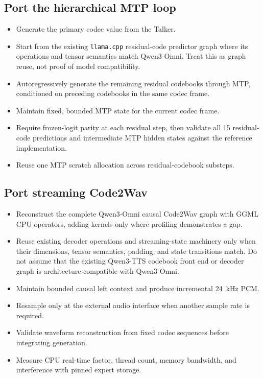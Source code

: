 \documentclass[10pt,letterpaper]{article}
\newcommand{\code}[1]{\texttt{#1}}
\begin{document}
\subsection{Port the hierarchical MTP loop}
\begin{itemize}
    \item Generate the primary codec value from the Talker.
    \item Start from the existing \code{llama.cpp} residual-code predictor graph where its operations and tensor semantics match Qwen3-Omni. Treat this as graph reuse, not proof of model compatibility.
    \item Autoregressively generate the remaining residual codebooks through MTP, conditioned on preceding codebooks in the same codec frame.
    \item Maintain fixed, bounded MTP state for the current codec frame.
    \item Require frozen-logit parity at each residual step, then validate all 15 residual-code predictions and intermediate MTP hidden states against the reference implementation.
    \item Reuse one MTP scratch allocation across residual-codebook substeps.
\end{itemize}

\subsection{Port streaming Code2Wav}
\begin{itemize}
    \item Reconstruct the complete Qwen3-Omni causal Code2Wav graph with GGML CPU operators, adding kernels only where profiling demonstrates a gap.
    \item Reuse existing decoder operations and streaming-state machinery only when their dimensions, tensor semantics, padding, and state transitions match. Do not assume that the existing Qwen3-TTS codebook front end or decoder graph is architecture-compatible with Qwen3-Omni.
    \item Maintain bounded causal left context and produce incremental 24~kHz PCM.
    \item Resample only at the external audio interface when another sample rate is required.
    \item Validate waveform reconstruction from fixed codec sequences before integrating generation.
    \item Measure CPU real-time factor, thread count, memory bandwidth, and interference with pinned expert storage.
\end{itemize}
\end{document}

